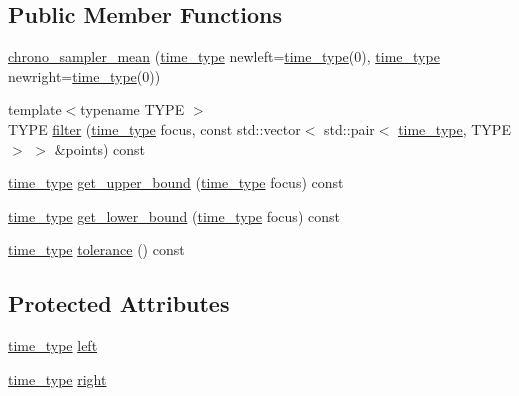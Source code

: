 \subsection*{Public Member Functions}
\begin{DoxyCompactItemize}
\item 
\hyperlink{classmui_1_1chrono__sampler__mean_a4dba4a01f178d5197b97f0148d4b83d4}{chrono\+\_\+sampler\+\_\+mean} (\hyperlink{classmui_1_1chrono__sampler__mean_aa818a9c8850aa9fda611430c158a0072}{time\+\_\+type} newleft=\hyperlink{classmui_1_1chrono__sampler__mean_aa818a9c8850aa9fda611430c158a0072}{time\+\_\+type}(0), \hyperlink{classmui_1_1chrono__sampler__mean_aa818a9c8850aa9fda611430c158a0072}{time\+\_\+type} newright=\hyperlink{classmui_1_1chrono__sampler__mean_aa818a9c8850aa9fda611430c158a0072}{time\+\_\+type}(0))
\item 
{\footnotesize template$<$typename T\+Y\+PE $>$ }\\T\+Y\+PE \hyperlink{classmui_1_1chrono__sampler__mean_af98f70be1855c6fc48309ced44400dbe}{filter} (\hyperlink{classmui_1_1chrono__sampler__mean_aa818a9c8850aa9fda611430c158a0072}{time\+\_\+type} focus, const std\+::vector$<$ std\+::pair$<$ \hyperlink{classmui_1_1chrono__sampler__mean_aa818a9c8850aa9fda611430c158a0072}{time\+\_\+type}, T\+Y\+PE $>$ $>$ \&points) const
\item 
\hyperlink{classmui_1_1chrono__sampler__mean_aa818a9c8850aa9fda611430c158a0072}{time\+\_\+type} \hyperlink{classmui_1_1chrono__sampler__mean_a56e9614147dd1a609b3552cb2b1547ca}{get\+\_\+upper\+\_\+bound} (\hyperlink{classmui_1_1chrono__sampler__mean_aa818a9c8850aa9fda611430c158a0072}{time\+\_\+type} focus) const
\item 
\hyperlink{classmui_1_1chrono__sampler__mean_aa818a9c8850aa9fda611430c158a0072}{time\+\_\+type} \hyperlink{classmui_1_1chrono__sampler__mean_a508bd28c3cdae31a4fbc768f46194964}{get\+\_\+lower\+\_\+bound} (\hyperlink{classmui_1_1chrono__sampler__mean_aa818a9c8850aa9fda611430c158a0072}{time\+\_\+type} focus) const
\item 
\hyperlink{classmui_1_1chrono__sampler__mean_aa818a9c8850aa9fda611430c158a0072}{time\+\_\+type} \hyperlink{classmui_1_1chrono__sampler__mean_a371dfebeba7515e4bb3a95f0868411f6}{tolerance} () const
\end{DoxyCompactItemize}
\subsection*{Protected Attributes}
\begin{DoxyCompactItemize}
\item 
\hyperlink{classmui_1_1chrono__sampler__mean_aa818a9c8850aa9fda611430c158a0072}{time\+\_\+type} \hyperlink{classmui_1_1chrono__sampler__mean_a39d914bda15d16d29a66de7711dcafd2}{left}
\item 
\hyperlink{classmui_1_1chrono__sampler__mean_aa818a9c8850aa9fda611430c158a0072}{time\+\_\+type} \hyperlink{classmui_1_1chrono__sampler__mean_a21a36a568b9c621ff7e024a019822531}{right}
\end{DoxyCompactItemize}



